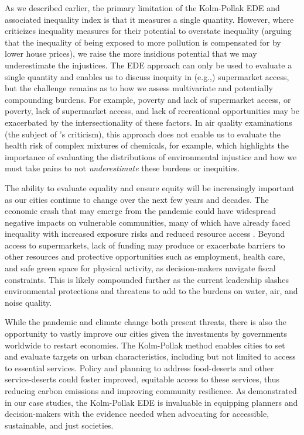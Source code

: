 \documentclass[final,3p,times,onecolumn,sort&compress]{elsarticle}
\begin{document}
As we described earlier, the primary limitation of the Kolm-Pollak EDE and associated inequality index is that it measures a single quantity.
However, where \cite{Cox2012-lg} criticizes inequality measures for their potential to overstate inequality (arguing that the inequality of being exposed to more pollution is compensated for by lower house prices), we raise the more insidious potential that we may underestimate the injustices.
The EDE approach can only be used to evaluate a single quantity and enables us to discuss inequity in (e.g.,) supermarket access, but the challenge remains as to how we assess multivariate and potentially compounding burdens.
For example, poverty and lack of supermarket access, or poverty, lack of supermarket access, and lack of recreational opportunities may be exacerbated by the intersectionality of these factors.
In air quality examinations (the subject of \cite{Cox2012-lg}'s criticism), this approach does not enable us to evaluate the health risk of complex mixtures of chemicals, for example, which highlights the importance of evaluating the distributions of environmental injustice and how we must take pains to not \textit{underestimate} these burdens or inequities.

The ability to evaluate equality and ensure equity will be increasingly important as our cities continue to change over the next few years and decades.
The economic crash that may emerge from the pandemic could have widespread negative impacts on vulnerable communities, many of which have already faced inequality with increased exposure risks \citep{patel2020-poverty} and reduced resource access \citep{power2020-covid}. 
Beyond access to supermarkets, lack of funding may produce or exacerbate barriers to other resources and protective opportunities such as employment, health care, and safe green space for physical activity, as decision-makers navigate fiscal constraints.
This is likely compounded further as the current leadership slashes environmental protections and threatens to add to the burdens on water, air, and noise quality.

While the pandemic and climate change both present threats, there is also the opportunity to vastly improve our cities given the investments by governments worldwide to restart economies.
The Kolm-Pollak method enables cities to set and evaluate targets on urban characteristics, including but not limited to access to essential services. 
Policy and planning to address food-deserts and other service-deserts could foster improved, equitable access to these services, thus reducing carbon emissions and improving community resilience.
As demonstrated in our case studies, the Kolm-Pollak EDE is invaluable in equipping planners and decision-makers with the evidence needed when advocating for accessible, sustainable, and just societies.
\end{document}
